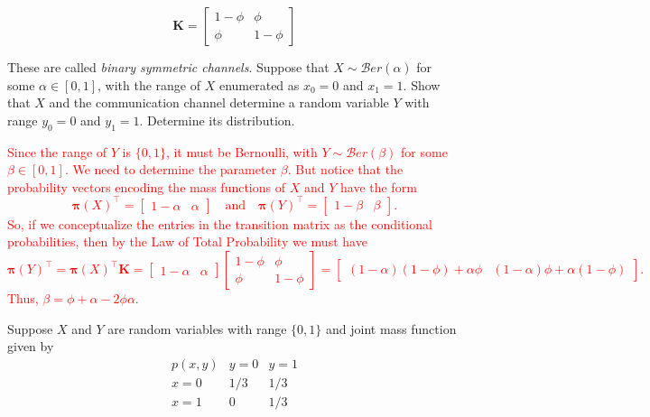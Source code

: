 \documentclass[12pt,reqno]{amsart}
\begin{document}
	\[\mathbf{K} = \begin{bmatrix}
	1 - \phi & \phi \\
	\phi & 1-\phi
	\end{bmatrix}
	\]
	
These are called \textit{binary symmetric channels}. Suppose that $X \sim \mathcal{B}er(\alpha)$ for some $\alpha \in [0,1]$, with the range of $X$ enumerated as $x_0 = 0$ and $x_1=1$. Show that $X$ and the communication channel determine a random variable $Y$ with range $y_0=0$ and $y_1=1$. Determine its distribution.

\bigskip
\textcolor{red}{Since the range of $Y$ is $\{0,1\}$, it must be Bernoulli, with $Y \sim \mathcal{B}er(\beta)$ for some $\beta \in [0,1]$. We need to determine the parameter $\beta$. But notice that the probability vectors encoding the mass functions of $X$ and $Y$ have the form
	\[\boldsymbol{\pi}(X)^\intercal = \begin{bmatrix} 1- \alpha & \alpha \end{bmatrix} \quad \text{and} \quad \boldsymbol{\pi}(Y)^\intercal = \begin{bmatrix} 1- \beta & \beta \end{bmatrix}.
	\]
So, if we conceptualize the entries in the transition matrix as the conditional probabilities, then by the Law of Total Probability we must have
	\[\boldsymbol{\pi}(Y)^\intercal = \boldsymbol{\pi}(X)^\intercal\mathbf{K} = \begin{bmatrix} 1- \alpha & \alpha \end{bmatrix} \begin{bmatrix}
	1 - \phi & \phi \\
	\phi & 1-\phi
	\end{bmatrix}
 = \begin{bmatrix} (1-\alpha)(1-\phi) + \alpha \phi & (1-\alpha)\phi + \alpha(1-\phi) \end{bmatrix}.
	\]
Thus, $\beta = \phi + \alpha - 2\phi \alpha$.}
\bigskip








\prob Suppose $X$ and $Y$ are random variables with range $\{0,1\}$ and joint mass function given by
	\[\begin{array}{c|cc}
	p(x,y) & y=0 & y=1 \\ \hline
	x=0 & 1/3 & 1/3 \\ 
	x=1 & 0 & 1/3
	\end{array}
	\]
	
\end{document}
